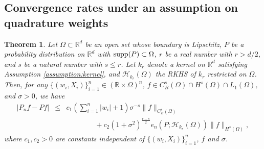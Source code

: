\documentclass[11pt]{article}
\newtheorem{theorem}{Theorem}
\theoremstyle{remark}
\theoremstyle{example}
\theoremstyle{remark}
\renewcommand{\H}{{\mathcal{H}}}
\newcommand{\R}{\mathbb{R}}
\begin{document}
\subsection{Convergence rates under an assumption on quadrature weights}
\label{sec:upper_weights}
\begin{theorem} \label{theo:sob_weight}
Let $\Omega \subset \R^d$ be an open set whose boundary is Lipschitz, $P$ be a probability distribution on $\R^d$ with ${\rm supp}(P) \subset \Omega$,  
$r$ be a real number with $r>d/2$, and $s$ be a natural number with $s \leq r$.  Let  
$k_r$ denote a kernel on $\R^d$ satisfying Assumption \ref{assumption:kernel}, and  $\H_{k_r}(\Omega)$ the RKHS of $k_r$ restricted on $\Omega$.
%
Then, for any $\{ (w_i,X_i) \}_{i=1}^n \in (\R \times \Omega)^n$, $f \in C_B^s (\Omega) \cap H^s (\Omega) \cap L_1(\Omega)$, and $\sigma > 0$, we have
\begin{eqnarray} 
 | P_n f - P f | 
&\leq&  c_1 \left( \sum_{i=1}^n |w_i| + 1 \right)  \sigma^{-s} \| f \|_{C_B^s(\Omega)}\nonumber\\
&&\qquad\qquad +  c_2 (1+\sigma^2)^{\frac{r-s}{2}}  e_n(P;\H_{k_r}(\Omega)) \| f \|_{H^s(\Omega)}, \label{eq:sob_weight_56}
\end{eqnarray}
where $c_1, c_2 > 0$ are constants independent of $\{ (w_i,X_i) \}_{i=1}^n$, $f$ and $\sigma$.%
\end{theorem}
\end{document}
